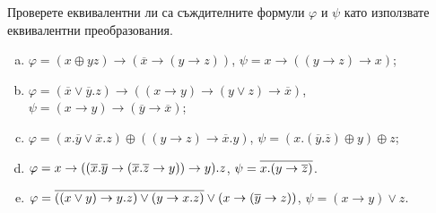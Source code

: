 \begin{problem}
  Проверете еквивалентни ли са съждителните формули $\varphi$ и $\psi$ като използвате еквивалентни преобразования.
  \begin{enumerate}[a)]
  \item
    $\varphi = (x\oplus yz)\rightarrow (\overline{x}\rightarrow (y\rightarrow z))$,
    $\psi = x\rightarrow ((y\rightarrow z)\rightarrow x)$;
  \item
    $\varphi = (\overline{x}\vee \overline{y}.z)\rightarrow ((x\rightarrow y)\rightarrow (y\vee z)\rightarrow\overline{x})$,
    $\psi = (x\rightarrow y)\rightarrow(\overline{y}\rightarrow\overline{x})$;
  \item
    $\varphi = (x.\overline{y}\vee \overline{x}.z)\oplus ((y\rightarrow z)\rightarrow \overline{x}.y)$,
    $\psi = (x.(\overline{y}.\overline{z})\oplus y)\oplus z$;
  \item
    $\varphi = x\rightarrow ((\overline{x}.\overline{y}\rightarrow(\overline{x}.\overline{z}\rightarrow y))\rightarrow y).z$,
    $\psi = \overline{x.(y\rightarrow\overline{z})}$.
  \item
    $\varphi = \overline{((x\vee y) \rightarrow y.z)\vee (y\rightarrow x.z)} \vee (x\rightarrow (\overline{y}\rightarrow z))$,
    $\psi = (x\rightarrow y)\vee z$.
  \end{enumerate}
\end{problem}

